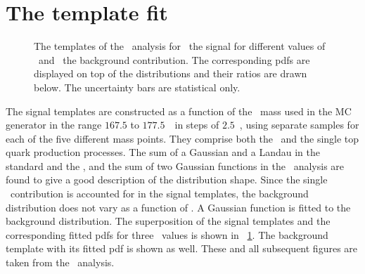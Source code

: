 \section{The template fit}
\label{sec:templates8TeV}
%
%
\begin{figure}[tbp!]
\centering
{}
\caption[Template fit functions for $\sqrts=8$~\TeV\ data]{
%
The templates of the \mvabased\ analysis for~ the signal for different values of \mt\ and~ the background contribution.
%
The corresponding \glspl{pdf} are displayed on top of the distributions and their ratios are drawn below.
%
The uncertainty bars are statistical only.
%
\label{fig:tmpl8TeV}}
\end{figure}
%
The signal templates are constructed as a function of the \tquark\ mass used in the \gls{MC} generator in the range $167.5$ to $177.5$~\GeV\ in steps of $2.5$~\GeV, using separate samples for each of the five different mass points.
%
They comprise both the \ttbar\ and the single top quark production processes. The sum of a Gaussian and a Landau in the standard and the \cutbased, and the sum of two Gaussian functions in the \mvabased\ analysis are found to give a good description of the distribution shape. 
%
Since the single \tquark\ contribution is accounted for in the signal templates, the background distribution does not vary as a function of \mt. A Gaussian function is fitted to the background distribution.
%
The superposition of the signal templates and the corresponding fitted \glspl{pdf} for three \mt\ values is shown in \fig~\ref{fig:tmpl8TeV}. The background template with its fitted \gls{pdf} is shown as well. These and all subsequent figures are taken from the \mvabased\ analysis. 

